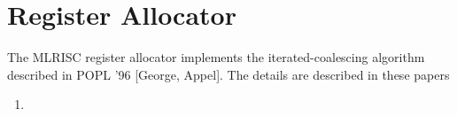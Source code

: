 \section{Register Allocator}

The MLRISC register allocator implements the iterated-coalescing algorithm
described in POPL '96 [George, Appel].  The details are described in these
papers
\begin{enumerate}
\item {}
\end{enumerate}
